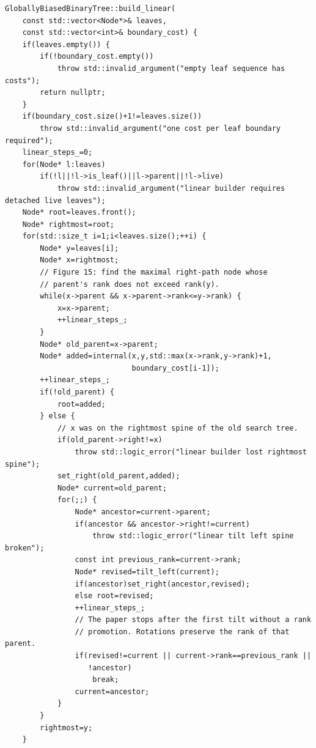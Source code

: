 \documentclass[11pt,a4paper,oneside]{report}
\theoremstyle{plain}
\theoremstyle{definition}
\theoremstyle{remark}
\DeclareRobustCommand{\file}[1]{\mtp_breakable_tt:n {#1}}
\begin{document}
\begin{lstlisting}[style=cpp,firstnumber=173,caption={\file{src/globally_biased_binary_tree.cpp}, lines 173--228: the bottom-up construction attributed in the code to BST85 (main loop).},label={lst:buildlinear}]
GloballyBiasedBinaryTree::build_linear(
    const std::vector<Node*>& leaves,
    const std::vector<int>& boundary_cost) {
    if(leaves.empty()) {
        if(!boundary_cost.empty())
            throw std::invalid_argument("empty leaf sequence has costs");
        return nullptr;
    }
    if(boundary_cost.size()+1!=leaves.size())
        throw std::invalid_argument("one cost per leaf boundary required");
    linear_steps_=0;
    for(Node* l:leaves)
        if(!l||!l->is_leaf()||l->parent||!l->live)
            throw std::invalid_argument("linear builder requires detached live leaves");
    Node* root=leaves.front();
    Node* rightmost=root;
    for(std::size_t i=1;i<leaves.size();++i) {
        Node* y=leaves[i];
        Node* x=rightmost;
        // Figure 15: find the maximal right-path node whose
        // parent's rank does not exceed rank(y).
        while(x->parent && x->parent->rank<=y->rank) {
            x=x->parent;
            ++linear_steps_;
        }
        Node* old_parent=x->parent;
        Node* added=internal(x,y,std::max(x->rank,y->rank)+1,
                             boundary_cost[i-1]);
        ++linear_steps_;
        if(!old_parent) {
            root=added;
        } else {
            // x was on the rightmost spine of the old search tree.
            if(old_parent->right!=x)
                throw std::logic_error("linear builder lost rightmost spine");
            set_right(old_parent,added);
            Node* current=old_parent;
            for(;;) {
                Node* ancestor=current->parent;
                if(ancestor && ancestor->right!=current)
                    throw std::logic_error("linear tilt left spine broken");
                const int previous_rank=current->rank;
                Node* revised=tilt_left(current);
                if(ancestor)set_right(ancestor,revised);
                else root=revised;
                ++linear_steps_;
                // The paper stops after the first tilt without a rank
                // promotion. Rotations preserve the rank of that parent.
                if(revised!=current || current->rank==previous_rank ||
                   !ancestor)
                    break;
                current=ancestor;
            }
        }
        rightmost=y;
    }
\end{lstlisting}
\end{document}

